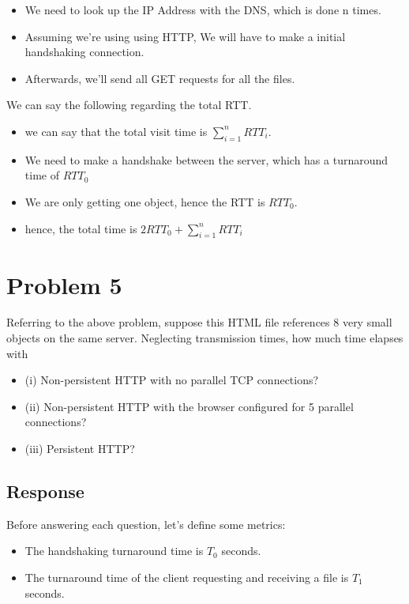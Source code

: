\documentclass{article}
\begin{document}
\begin{itemize}
    \item We need to look up the IP Address with the DNS, which is done n times. 
    \item Assuming we're using using HTTP, We will have to make a initial handshaking connection.
    \item Afterwards, we'll send all GET requests for all the files.
\end{itemize}

We can say the following regarding the total RTT.

\begin{itemize}
    \item we can say that the total visit time is $\sum_{i = 1}^{n} RTT_i$.
    \item We need to make a handshake between the server, which has a turnaround time of $RTT_0$
    \item We are only getting one object, hence the RTT is $RTT_0$.
    \item hence, the total time is $2RTT_0 + \sum_{i = 1}^{n} RTT_i$
\end{itemize}

\section{Problem 5}

Referring to the above problem, suppose this HTML file references 8 very small
objects on the same server. Neglecting transmission times, how much time elapses with

\begin{itemize}
    \item (i) Non-persistent HTTP with no parallel TCP connections?
    \item (ii) Non-persistent HTTP with the browser configured for 5 parallel connections?
    \item (iii) Persistent HTTP?
\end{itemize}

\subsection{Response}

Before answering each question, let's define some metrics:
\begin{itemize}
    \item The handshaking turnaround time is $T_0$ seconds.
    \item The turnaround time of the client requesting and receiving a file is $T_1$ seconds.
\end{itemize}
\end{document}
